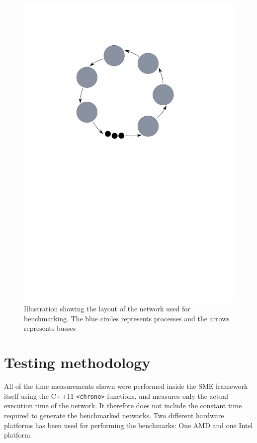 \begin{figure}
\centering
\includegraphics{figures/ring}
\caption[SME network used for benchmarking]{Illustration showing the
  layout of the network used for benchmarking. The blue circles
  represents processes and the arrows represents busses}
\label{fig:benchnetwork}
\end{figure}


\section{Testing methodology}
All of the time measurements shown were performed inside the SME
framework itself using the C++11 \texttt{<chrono>} functions, and
measures only the actual execution time of the network. It therefore
does not include the constant time required to generate the
benchmarked networks. Two different hardware platforms has been used
for performing the benchmarks: One AMD and one Intel platform.

